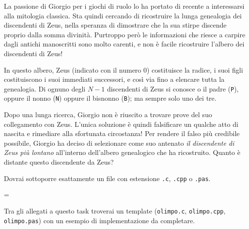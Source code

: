 \usepackage{xcolor}
\usepackage{afterpage}
\usepackage{pifont,mdframed}
\usepackage[bottom]{footmisc}

\makeatletter
\gdef\this@inputfilename{input.txt}
\gdef\this@outputfilename{output.txt}
\makeatother

\newcommand{\inputfile}{\texttt{input.txt}}
\newcommand{\outputfile}{\texttt{output.txt}}

\newenvironment{warning}
  {\par\begin{mdframed}[linewidth=2pt,linecolor=gray]%
    \begin{list}{}{\leftmargin=1cm
                   \labelwidth=\leftmargin}\item[\Large\ding{43}]}
  {\end{list}\end{mdframed}\par}

	La passione di Giorgio per i giochi di ruolo lo ha portato di recente a interessarsi alla mitologia classica. Sta quindi cercando di ricostruire la lunga genealogia dei discendenti di Zeus, nella speranza di dimostrare che la sua stirpe discende proprio dalla somma divinità. Purtroppo però le informazioni che riesce a carpire dagli antichi manoscritti sono molto carenti, e non è facile ricostruire l'albero dei discendenti di Zeus!
	
	In questo albero, Zeus (indicato con il numero $0$) costituisce la radice, i suoi figli costituiscono i suoi immediati successori, e così via fino a elencare tutta la genealogia. Di ognuno degli $N-1$ discendenti di Zeus si conosce o il padre (\texttt{P}), oppure il nonno (\texttt{N}) oppure il bisnonno (\texttt{B}); ma sempre solo uno dei tre.

	Dopo una lunga ricerca, Giorgio non è riuscito a trovare prove del suo collegamento con Zeus. L'unica soluzione è quindi falsificare un qualche atto di nascita e rimediare alla sfortunata circostanza! Per rendere il falso più credibile possibile, Giorgio ha deciso di selezionare come suo antenato \emph{il discendente di Zeus più lontano} all'interno dell'albero genealogico che ha ricostruito. Quanto è distante questo discendente da Zeus?

\Implementation
Dovrai sottoporre esattamente un file con estensione \texttt{.c}, \texttt{.cpp} o \texttt{.pas}.

\begin{warning}
Tra gli allegati a questo task troverai un template (\texttt{olimpo.c}, \texttt{olimpo.cpp}, \texttt{olimpo.pas}) con un esempio di implementazione da completare.
\end{warning}

